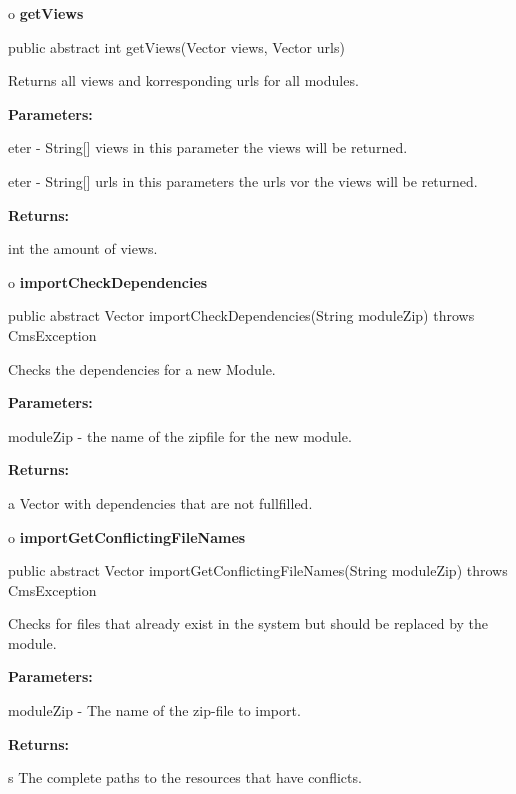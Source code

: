 o {\bf getViews} 

\begin{PRE}
 public abstract int getViews(Vector views,
                              Vector urls)
\end{PRE}

\begin{description}
\htmlDD Returns all views and korresponding urls for all modules. 

\begin{description}
\item {\bf Parameters:}  

eter - String[] views in this parameter the views will be returned.  

eter - String[] urls in this parameters the urls vor the views will be
returned.  
\item {\bf Returns:}  

int the amount of views.  
\end{description}

\end{description}

o {\bf importCheckDependencies} 

\begin{PRE}
 public abstract Vector importCheckDependencies(String moduleZip) throws CmsException
\end{PRE}

\begin{description}
\htmlDD Checks the dependencies for a new Module. 

\begin{description}
\item {\bf Parameters:}  

moduleZip - the name of the zipfile for the new module.  
\item {\bf Returns:}  

a Vector with dependencies that are not fullfilled.  
\end{description}

\end{description}

o {\bf importGetConflictingFileNames} 

\begin{PRE}
 public abstract Vector importGetConflictingFileNames(String moduleZip) throws CmsException
\end{PRE}

\begin{description}
\htmlDD Checks for files that already exist in the system but should be
replaced by the module. 

\begin{description}
\item {\bf Parameters:}  

moduleZip - The name of the zip-file to import.  
\item {\bf Returns:}  

s The complete paths to the resources that have conflicts.  
\end{description}

\end{description}

